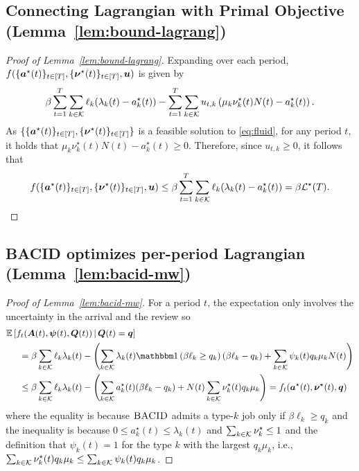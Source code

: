 \subsection{Connecting Lagrangian with Primal Objective (Lemma~\ref{lem:bound-lagrang})}\label{app:lem-bound-lagrang}
\begin{proof}[Proof of Lemma~\ref{lem:bound-lagrang}]
Expanding over each period, $f(\{\boldsymbol{a}^\star(t)\}_{t \in [T]},\{\boldsymbol{\nu}^\star(t)\}_{t \in [T]},\boldsymbol{u})$ is given by
\[
\beta\sum_{t=1}^T\sum_{k \in \mathcal{K}} \ell_k(\lambda_k(t)-a_k^\star(t)) - \sum_{t=1}^T \sum_{k \in \mathcal{K}} u_{t,k}\left(\mu_k\nu_k^\star(t)N(t)-a_k^\star(t) \right).
\] As $\{\{\boldsymbol{a}^\star(t)\}_{t \in [T]},\{\boldsymbol{\nu}^\star(t)\}_{t \in [T]}\}$ is a feasible solution to \eqref{eq:fluid}, for any period $t$, it holds that $\mu_k\nu_k^\star(t)N(t)-a_k^\star(t) \geq 0$. Therefore, since $u_{t,k} \geq 0$, it follows that \[f(\{\boldsymbol{a}^\star(t)\}_{t\in[T]},\{\boldsymbol{\nu}^\star(t)\}_{t\in[T]},\boldsymbol{u}) \leq \beta\sum_{t=1}^T \sum_{k \in \mathcal{K}} \ell_k(\lambda_k(t)-a_k^\star(t)) = \beta \mathcal{L}^\star(T).\]
\end{proof}

\subsection{\textsc{BACID} optimizes per-period Lagrangian (Lemma~\ref{lem:bacid-mw})}\label{app:lem-bacid-mw}
\begin{proof}[Proof of Lemma~\ref{lem:bacid-mw}]
For a period $t$, the expectation only involves the uncertainty in the arrival and the review so 
\begin{align*}
&\expect{f_t(\bolds{A}(t),\bolds{\psi}(t),\bolds{Q}(t)) \mid \bolds{Q}(t) = \bolds{q}} \\
&\hspace{0.2in}= \beta\sum_{k \in \set{K}}\ell_k\lambda_k(t) - \left(\sum_{k \in \set{K}} \lambda_k(t)\indic{\beta \ell_k \geq q_k}(\beta \ell_k-q_k) + \sum_{k \in \set{K}} \psi_k(t) q_k\mu_k N(t)\right) \\
&\hspace{0.2in}\leq \beta\sum_{k \in \set{K}}\ell_k\lambda_k(t) - \left(\sum_{k \in \set{K}} a^\star_k(t)(\beta \ell_k-q_k) + N(t)\sum_{k \in \set{K}} \nu^\star_k(t) q_k\mu_k\right)  = f_t(\bolds{a}^\star(t),\bolds{\nu}^\star(t), \bolds{q})
\end{align*}
where the equality is because $\textsc{BACID}$ admits a type-$k$ job only if $\beta \ell_k \geq q_k$ and the inequality is because $0 \leq a_k^{\star}(t) \leq \lambda_k(t)$ and $\sum_{k \in \mathcal{K}} \nu^\star_k \leq 1$ and the definition that $\psi_k(t) = 1$ for the type $k$ with the largest $q_k\mu_k$, i.e., $\sum_{k \in \mathcal{K}} \nu_k^\star(t) q_k \mu_k \leq \sum_{k \in \mathcal{K}} \psi_k(t) q_k \mu_k$. 
\end{proof}